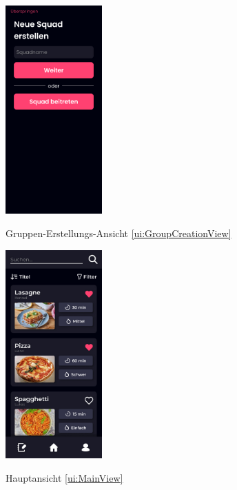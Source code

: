 \documentclass[parskip=full]{scrartcl}
\begin{document}
\begin{figure}[htp]
    \begin{minipage}
        [t]{0.49\textwidth}
        \centering
        \includegraphics[height=80mm]{images/ui/GroupCreationView.jpg}
        \label{fig:GroupCreationView}
        \caption{Gruppen-Erstellungs-Ansicht \ref{ui:GroupCreationView}}
    \end{minipage}
    \begin{minipage}
        [t]{0.49\textwidth}
        \centering
        \includegraphics[height=80mm]{images/ui/MainView.jpg}
        \label{fig:MainView}
        \caption{Hauptansicht \ref{ui:MainView}}
    \end{minipage}
\end{figure}
\end{document}
